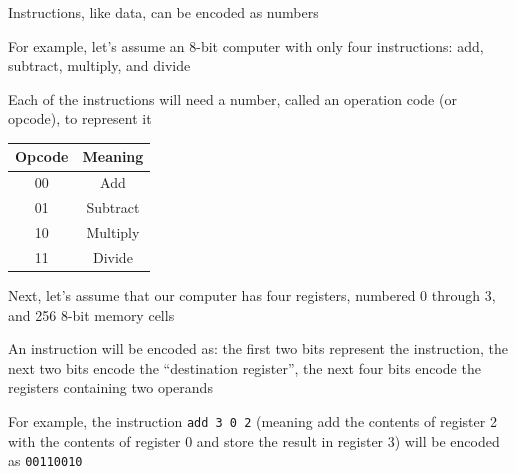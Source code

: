 \documentclass[8pt,a4paper,compress]{beamer}
\begin{document}
\begin{frame}[fragile]
\pause

Instructions, like data, can be encoded as numbers

\pause
\bigskip

For example, let's assume an 8-bit computer with only four instructions: add, subtract, multiply, and divide

\pause
\bigskip

Each of the instructions will need a number, called an operation code (or opcode), to represent it
\begin{center}
\begin{tabular}{cc}
Opcode & Meaning \\ \hline
00 & Add \\
01 & Subtract \\ 
10 & Multiply \\
11 & Divide
\end{tabular}
\end{center}

\pause
\bigskip

Next, let's assume that our computer has four registers, numbered 0 through 3, and 256 8-bit memory cells

\pause
\bigskip

An instruction will be encoded as: the first two bits represent the instruction, the next two bits encode the ``destination register'', the next four bits encode the registers containing two operands

\pause
\bigskip

For example, the instruction \lstinline{add 3 0 2} (meaning add the contents of register 2 with the contents of register 0 and store the result in register 3) will be encoded as \lstinline{00110010}
\end{frame}
\end{document}
